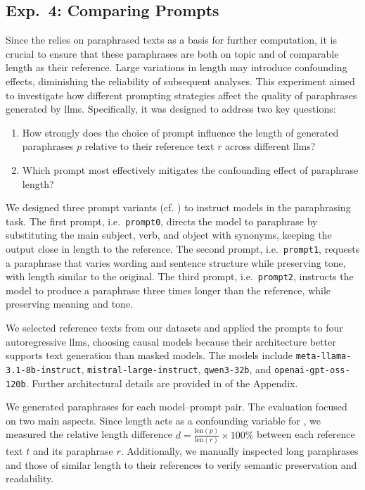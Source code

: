 \subsection{Exp.\ 4: Comparing Prompts}
\label{subsec:prompt_impact_setup}

Since the \impAppr{} relies on paraphrased texts as a basis for further computation, it is crucial to ensure that these paraphrases are both on topic and of comparable length as their reference.  
Large variations in length may introduce confounding effects, diminishing the reliability of subsequent analyses.
This experiment aimed to investigate how different prompting strategies affect the quality of paraphrases generated by \acp{llm}. 
Specifically, it was designed to address two key questions:
\begin{enumerate}
\item How strongly does the choice of prompt influence the length of generated paraphrases $p$ relative to their reference text $r$ across different \acp{llm}?
\item Which prompt most effectively mitigates the confounding effect of paraphrase length?
\end{enumerate}

We designed three prompt variants (cf. ) to instruct models in the paraphrasing task.
The first prompt, i.e.\ \texttt{prompt0}, directs the model to paraphrase by substituting the main subject, verb, and object with synonyms, keeping the output close in length to the reference.  
The second prompt, i.e.\ \texttt{prompt1}, requests a paraphrase that varies wording and sentence structure while preserving tone, with length similar to the original.  
The third prompt, i.e.\ \texttt{prompt2}, instructs the model to produce a paraphrase three times longer than the reference, while preserving meaning and tone. 

We selected reference texts from our datasets and applied the prompts to four autoregressive \acp{llm}, choosing causal models because their architecture better supports text generation than masked models. 
The models include \texttt{meta-llama-3.1-8b-instruct}, \texttt{mistral-large-instruct}, \texttt{qwen3-32b}, and \texttt{openai-gpt-oss-120b}.
Further architectural details are provided in  of the Appendix. 

We generated paraphrases for each model–prompt pair.
The evaluation focused on two main aspects. 
Since length acts as a confounding variable for \imps{}, we measured the relative length difference $d = \frac{\mathrm{len}(p)}{\mathrm{len}(r)}\times 100 \%$ between each reference text $t$ and its paraphrase $r$. 
Additionally, we manually inspected long paraphrases and those of similar length to their references to verify semantic preservation and readability.
